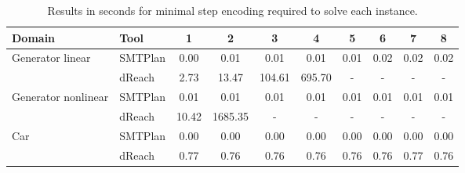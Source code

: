 \begin{table}[ht]
\centering
\def\arraystretch{1.1}
\begin{tabular}{|l|l|cccccccc|}
\hline
Domain         & Tool      & 1     & 2    & 3    & 4    & 5    & 6    & 7     & 8     \\
\hline

\multirow{2}{*}{\parbox{6em}{Generator linear}}
               & SMTPlan  & 0.00  & 0.01  & 0.01   & 0.01   & 0.01 & 0.02 & 0.02  & 0.02  \\
               & dReach    & 2.73  & 13.47 & 104.61 & 695.70 & -    & -    & -     & -     \\
\hline \hline
\multirow{2}{*}{\parbox{6em}{Generator nonlinear}}
               & SMTPlan  & 0.01  & 0.01    & 0.01 & 0.01   & 0.01 & 0.01 & 0.01  & 0.01 \\
               & dReach    & 10.42 & 1685.35 & -    & -      & -    & -    & -     & -    \\
\hline \hline
\multirow{2}{*}{\parbox{6em}{Car}}
               & SMTPlan  & 0.00  & 0.00 & 0.00 & 0.00 & 0.00 & 0.00 & 0.00 & 0.00  \\
               & dReach    & 0.77  & 0.76 & 0.76 & 0.76 & 0.76 & 0.76 & 0.77 & 0.76  \\
\hline
\end{tabular}
\caption{Results in seconds for minimal step encoding required to solve each instance.}
\label{tab:finalstep}
\end{table}

